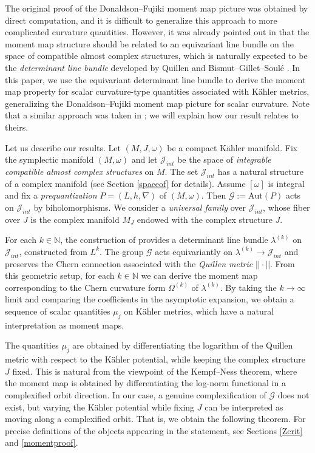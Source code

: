 \documentclass[12pt,reqno,a4paper]{amsart}
\numberwithin{equation}{section}
\theoremstyle{definition}
\theoremstyle{remark}
\begin{document}
The original proof of the Donaldson–Fujiki moment map picture was obtained by direct computation, and it is difficult to generalize this approach to more complicated curvature quantities. However, it was already pointed out in \cite{fujiki1992moduli,donaldson1997remarks,donaldson2001planck} that the moment map structure should be related to an equivariant line bundle on the space of compatible almost complex structures, which is naturally expected to be the \textit{determinant line bundle} developed by Quillen \cite{quillen1985determinants} and Bismut--Gillet--Soul\'e \cite{bismut1988analytic3}. In this paper, we use the equivariant determinant line bundle to derive the moment map property for scalar curvature-type quantities associated with K\"ahler metrics, generalizing the Donaldson--Fujiki moment map picture for scalar curvature. Note that a similar approach was taken in \cite{foth2007manifold}; we will explain how our result relates to theirs.

Let us describe our results. Let $(M,J,\omega)$ be a compact K\"ahler manifold. Fix the symplectic manifold $(M,\omega)$ and let $\mathcal{J}_{int}$ be the space of \textit{integrable compatible almost complex structures} on $M$. The set $\mathcal{J}_{int}$ has a natural structure of a complex manifold (see Section \ref{spaceof} for details). Assume $[\omega]$ is integral and fix a \textit{prequantization} $P=(L,h,\nabla)$ of $(M,\omega)$. Then $\mathcal{G}:=\mathrm{Aut}(P)$ acts on $\mathcal{J}_{int}$ by biholomorphisms. We consider a \textit{universal family} over $\mathcal{J}_{int}$, whose fiber over $J$ is the complex manifold $M_J$ endowed with the complex structure $J$. 

For each $k\in\mathbb{N}$, the construction of \cite{bismut1988analytic3} provides a determinant line bundle $\lambda^{(k)}$ on $\mathcal{J}_{int}$, constructed from $L^k$. The group $\mathcal{G}$ acts equivariantly on $\lambda^{(k)}\rightarrow\mathcal{J}_{int}$ and preserves the Chern connection associated with the \textit{Quillen metric} $||\cdot||$. From this geometric setup, for each $k\in \mathbb{N}$ we can derive the moment map corresponding to the Chern curvature form $\Omega^{(k)}$ of $\lambda^{(k)}$. By taking the $k\rightarrow\infty$ limit and comparing the coefficients in the asymptotic expansion, we obtain a sequence of scalar quantities $\mu_j$ on K\"ahler metrics, which have a natural interpretation as moment maps. 

The quantities $\mu_j$ are obtained by differentiating the logarithm of the Quillen metric with respect to the K\"ahler potential, while keeping the complex structure $J$ fixed. This is natural from the viewpoint of the Kempf--Ness theorem, where the moment map is obtained by differentiating the log-norm functional in a complexified orbit direction. In our case, a genuine complexification of $\mathcal{G}$ does not exist, but varying the K\"ahler potential while fixing $J$ can be interpreted as moving along a complexified orbit. That is, we obtain the following theorem. For precise definitions of the objects appearing in the statement, see Sections \ref{Zcrit} and \ref{momentproof}.
\end{document}
